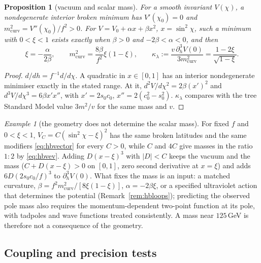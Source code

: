 \documentclass[aps,pra,onecolumn,superscriptaddress,nofootinbib,10pt]{revtex4-2}
\newtheorem{proposition}[theorem]{Proposition}
\theoremstyle{definition}
\theoremstyle{remark}
\newtheorem{example}[theorem]{Example}
\begin{document}
\begin{proposition}[vacuum and scalar mass]\label{prop:hbmass}
For a smooth invariant $V(\chi)$, a nondegenerate interior broken minimum has $V'(\chi_0)=0$ and $m_{\mathrm{curv}}^2=V''(\chi_0)/f^2>0$.  For
$V=V_0+\alpha x+\beta x^2$, $x=\sin^2\chi$, such a minimum with $0<\xi<1$ exists exactly when $\beta>0$ and $-2\beta<\alpha<0$, and then
\begin{equation}\label{eq:hbvev}
\xi=-\frac\alpha{2\beta},\qquad m_{\mathrm{curv}}^2=\frac{8\beta}{f^2}\xi(1-\xi),\qquad \kappa_\lambda:=\frac{v\,\partial_h^3V(0)}{3m_{\mathrm{curv}}^2}=\frac{1-2\xi}{\sqrt{1-\xi}} .
\end{equation}
\end{proposition}
\begin{proof}
$d/dh=f^{-1}d/d\chi$.  A quadratic in $x\in[0,1]$ has an interior nondegenerate minimiser exactly in the stated range.  At it,
$d^2V/d\chi^2=2\beta(x')^2$ and $d^3V/d\chi^3=6\beta x'x''$, with $x'=2s_0c_0$, $x''=2(c_0^2-s_0^2)$.  $\kappa_\lambda$ compares with the tree
Standard Model value $3m^2/v$ for the same mass and $v$.
\end{proof}

\begin{example}[the geometry does not determine the scalar mass]\label{ex:hbmasscounter}
For fixed $f$ and $0<\xi<1$, $V_C=C(\sin^2\chi-\xi)^2$ has the same broken latitudes and the same modifiers \eqref{eq:hbvector} for every
$C>0$, while $C$ and $4C$ give masses in the ratio $1:2$ by \eqref{eq:hbvev}.  Adding $D(x-\xi)^3$ with $\lvert D\rvert<C$ keeps the vacuum
and the mass ($C+D(x-\xi)>0$ on $[0,1]$, zero second derivative at $x=\xi$) and adds $6D(2s_0c_0/f)^3$ to $\partial_h^3V(0)$.  What fixes
the mass is an input: a matched curvature, $\beta=f^2m_{\mathrm{curv}}^2/[8\xi(1-\xi)]$, $\alpha=-2\beta\xi$, or a specified ultraviolet action
that determines the potential (Remark~\ref{rem:hbloops}); predicting the observed pole mass also requires the
momentum-dependent two-point function at its pole, with tadpoles and wave functions treated
consistently.  A mass near $125$\,GeV is therefore not a consequence of the geometry.
\end{example}

\subsection{Coupling and precision tests}
\end{document}
